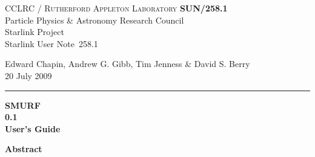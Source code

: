 \documentclass[twoside,11pt]{article}
\newcommand{\stardoccategory}  {Starlink User Note}
\newcommand{\stardocinitials}  {SUN}
\newcommand{\stardocnumber}    {258.1}
\newcommand{\stardocauthors}   {Edward Chapin, Andrew G. Gibb, Tim Jenness \& David S. Berry}
\newcommand{\stardocdate}      {20 July 2009}
\newcommand{\stardoctitle}     {SMURF}
\newcommand{\stardocversion}   {0.1}
\newcommand{\stardocmanual}    {User's Guide}
\newcommand{\stardocname}{\stardocinitials /\stardocnumber}
\newenvironment{latexonly}{}{}
\renewcommand{\_}{\texttt{\symbol{95}}}
\begin{document}
\thispagestyle{empty}

\begin{latexonly}
   CCLRC / \textsc{Rutherford Appleton Laboratory} \hfill \textbf{\stardocname}\\
   {\large Particle Physics \& Astronomy Research Council}\\
   {\large Starlink Project\\}
   {\large \stardoccategory\ \stardocnumber}
   \begin{flushright}
   \stardocauthors\\
   \stardocdate
   \end{flushright}
   \vspace{-4mm}
   \rule{\textwidth}{0.5mm}
   \vspace{5mm}
   \begin{center}
   {\Huge\textbf{\stardoctitle \\ [2.5ex]}}
   {\LARGE\textbf{\stardocversion \\ [4ex]}}
   {\Huge\textbf{\stardocmanual}}
   \end{center}
   \vspace{5mm}


   \vspace{10mm}
   \begin{center}
      {\Large\textbf{Abstract}}
   \end{center}
\end{latexonly}
\end{document}

